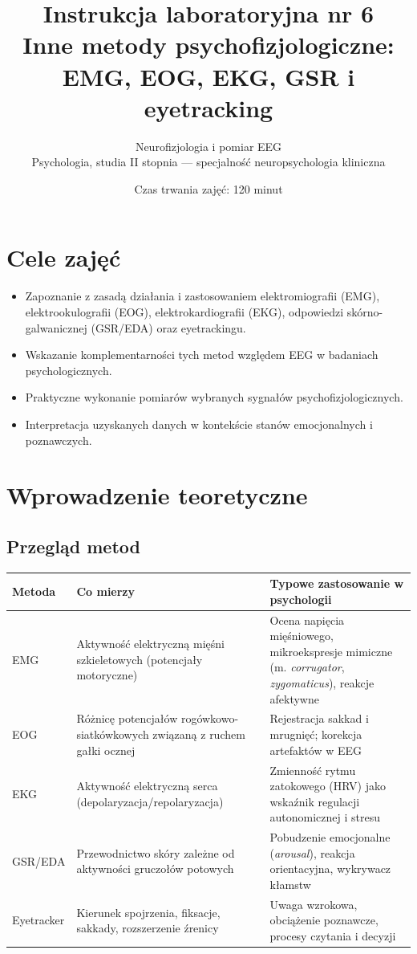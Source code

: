 \documentclass[11pt,a4paper]{article}
\title{\vspace{-1.5cm}\textbf{\color{navy}Instrukcja laboratoryjna nr 6}\\[4pt]
\Large Inne metody psychofizjologiczne: EMG, EOG, EKG, GSR i eyetracking}
\author{Neurofizjologia i pomiar EEG\\ Psychologia, studia II stopnia --- specjalność neuropsychologia kliniczna}
\date{Czas trwania zajęć: 120 minut}
\begin{document}
\maketitle
\thispagestyle{fancy}

\section{Cele zajęć}
\begin{itemize}[nosep]
  \item Zapoznanie z zasadą działania i zastosowaniem elektromiografii (EMG), elektrookulografii (EOG), elektrokardiografii (EKG), odpowiedzi skórno-galwanicznej (GSR/EDA) oraz eyetrackingu.
  \item Wskazanie komplementarności tych metod względem EEG w badaniach psychologicznych.
  \item Praktyczne wykonanie pomiarów wybranych sygnałów psychofizjologicznych.
  \item Interpretacja uzyskanych danych w kontekście stanów emocjonalnych i poznawczych.
\end{itemize}

\section{Wprowadzenie teoretyczne}

\subsection{Przegląd metod}
\begin{center}
\begin{tabular}{@{}p{1.6cm}p{5.3cm}p{6.9cm}@{}}
\toprule
\textbf{Metoda} & \textbf{Co mierzy} & \textbf{Typowe zastosowanie w psychologii}\\
\midrule
EMG & Aktywność elektryczną mięśni szkieletowych (potencjały motoryczne) & Ocena napięcia mięśniowego, mikroekspresje mimiczne (m. \emph{corrugator}, \emph{zygomaticus}), reakcje afektywne\\
EOG & Różnicę potencjałów rogówkowo-siatkówkowych związaną z ruchem gałki ocznej & Rejestracja sakkad i mrugnięć; korekcja artefaktów w EEG\\
EKG & Aktywność elektryczną serca (depolaryzacja/repolaryzacja) & Zmienność rytmu zatokowego (HRV) jako wskaźnik regulacji autonomicznej i stresu\\
GSR/EDA & Przewodnictwo skóry zależne od aktywności gruczołów potowych & Pobudzenie emocjonalne (\emph{arousal}), reakcja orientacyjna, wykrywacz kłamstw\\
Eyetracker & Kierunek spojrzenia, fiksacje, sakkady, rozszerzenie źrenicy & Uwaga wzrokowa, obciążenie poznawcze, procesy czytania i decyzji\\
\bottomrule
\end{tabular}
\end{center}
\end{document}
